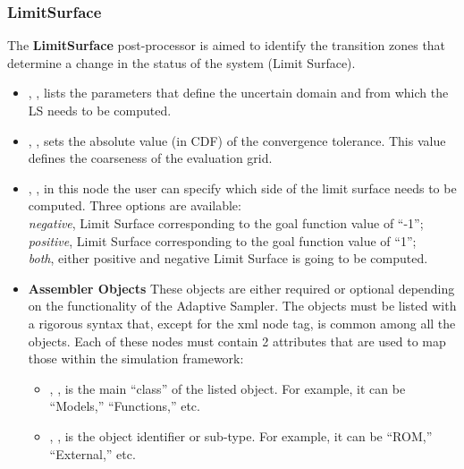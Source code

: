 \subsubsection{LimitSurface}
\label{LimitSurface}
The \textbf{LimitSurface} post-processor is aimed to identify the transition
zones that determine a change in the status of the system (Limit Surface).


\begin{itemize}
  \item {}, ,
  lists the parameters that define the uncertain domain and from which the LS
  needs to be computed.
  \item {}, , sets the absolute
  value (in CDF) of the convergence tolerance.
  This value defines the coarseness of the evaluation grid.
  \item {}, , in this node the user can specify
  which side of the limit surface needs to be computed. Three options are available:
  \\ \textit{negative},  Limit Surface corresponding to the goal function value of ``-1'';
  \\ \textit{positive}, Limit Surface corresponding to the goal function value of ``1'';
  \\ \textit{both}, either positive and negative Limit Surface is going to be computed.
  \item \textbf{Assembler Objects} These objects are either required or optional
  depending on the functionality of the Adaptive Sampler.
  The objects must be listed with a rigorous syntax that, except for the xml
  node tag, is common among all the objects.
  Each of these nodes must contain 2 attributes that are used to map those
  within the simulation framework:
   \begin{itemize}
    \item {}, , is the main
    ``class'' of the listed object.
    For example, it can be ``Models,'' ``Functions,'' etc.
    \item {}, , is the object
    identifier or sub-type.
    For example, it can be ``ROM,'' ``External,'' etc.
  \end{itemize}

\end{itemize}
